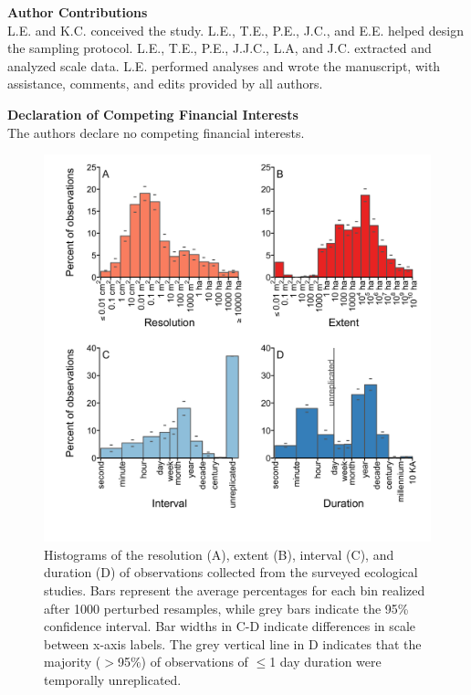 \documentclass[12pt]{article}
\begin{document}
\vspace{10pt}
\noindent \textbf{Author Contributions} 
\vspace{5pt}
\\
L.E. and K.C. conceived the study. L.E., T.E., P.E., J.C., and E.E. helped design the sampling protocol. L.E., T.E., P.E., J.J.C., L.A, and J.C. extracted and analyzed scale data. L.E. performed analyses and wrote the manuscript, with assistance, comments, and edits provided by all authors. 

\vspace{10pt}
\noindent \textbf{Declaration of Competing Financial Interests} 
\vspace{5pt}
\\
The authors declare no competing financial interests. 






\clearpage


\begin{figure}[!ht]
\includegraphics[width=1\textwidth]{../vignettes/figures/fig1.png}
\vspace{-0.15 cm}
\caption{Histograms of the resolution (A), extent (B), interval (C), and duration (D) of observations collected from the surveyed ecological studies. Bars represent the average percentages for each bin realized after 1000 perturbed resamples, while grey bars indicate the 95\% confidence interval. Bar widths in C-D indicate differences in scale between x-axis labels. The grey vertical line in D indicates that the majority ($>$95\%) of observations of $\leq$1 day duration were temporally unreplicated.}
\label{afoto1}
\end{figure}
\end{document}
